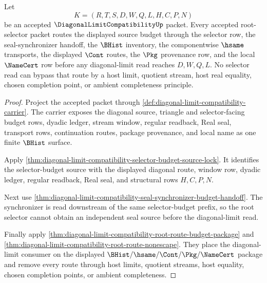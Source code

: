 \begin{theorem}
\label{thm:diagonal-limit-compatibility-root-selector-budget-lock}
Let
$$
K=(R,T,S,D,W,Q,L,H,C,P,N)
$$
be an accepted $\DiagonalLimitCompatibilityUp$ packet. Every accepted root-selector packet routes the displayed source budget through the selector row, the seal-synchronizer handoff, the $\BHist$ inventory, the componentwise $\hsame$ transports, the displayed $\Cont$ routes, the $\Pkg$ provenance row, and the local $\NameCert$ row before any diagonal-limit read reaches $D,W,Q,L$. No selector read can bypass that route by a host limit, quotient stream, host real equality, chosen completion point, or ambient completeness principle.
\end{theorem}
\begin{proof}
Project the accepted packet through \autoref{def:diagonal-limit-compatibility-carrier}. The carrier exposes the diagonal source, triangle and selector-facing budget rows, dyadic ledger, stream window, regular readback, Real seal, transport rows, continuation routes, package provenance, and local name as one finite $\BHist$ surface.

Apply \autoref{thm:diagonal-limit-compatibility-selector-budget-source-lock}. It identifies the selector-budget source with the displayed diagonal route, window row, dyadic ledger, regular readback, Real seal, and structural rows $H,C,P,N$.

Next use \autoref{thm:diagonal-limit-compatibility-seal-synchronizer-budget-handoff}. The synchronizer is read downstream of the same selector-budget prefix, so the root selector cannot obtain an independent seal source before the diagonal-limit read.

Finally apply \autoref{thm:diagonal-limit-compatibility-root-route-budget-package} and \autoref{thm:diagonal-limit-compatibility-root-route-nonescape}. They place the diagonal-limit consumer on the displayed $\BHist/\hsame/\Cont/\Pkg/\NameCert$ package and remove every route through host limits, quotient streams, host equality, chosen completion points, or ambient completeness.
\end{proof}


